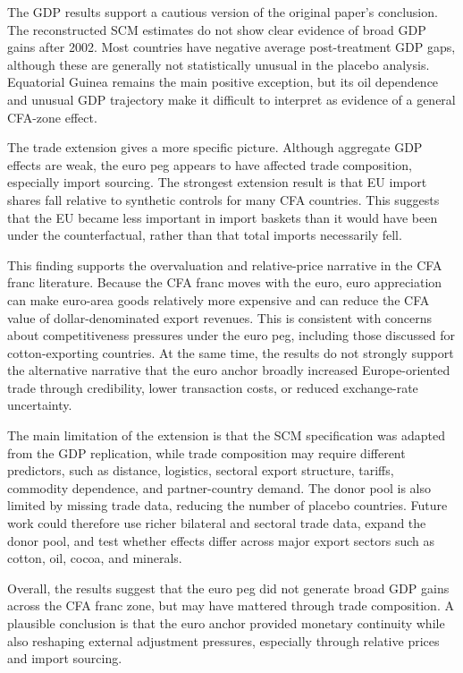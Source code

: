 \documentclass[a4paper]{article}
\begin{document}
The GDP results support a cautious version of the original paper's conclusion. The reconstructed SCM estimates do not show clear evidence of broad GDP gains after 2002. Most countries have negative average post-treatment GDP gaps, although these are generally not statistically unusual in the placebo analysis. Equatorial Guinea remains the main positive exception, but its oil dependence and unusual GDP trajectory make it difficult to interpret as evidence of a general CFA-zone effect.

The trade extension gives a more specific picture. Although aggregate GDP effects are weak, the euro peg appears to have affected trade composition, especially import sourcing. The strongest extension result is that EU import shares fall relative to synthetic controls for many CFA countries. This suggests that the EU became less important in import baskets than it would have been under the counterfactual, rather than that total imports necessarily fell.

This finding supports the overvaluation and relative-price narrative in the CFA franc literature. Because the CFA franc moves with the euro, euro appreciation can make euro-area goods relatively more expensive and can reduce the CFA value of dollar-denominated export revenues. This is consistent with concerns about competitiveness pressures under the euro peg, including those discussed for cotton-exporting countries. At the same time, the results do not strongly support the alternative narrative that the euro anchor broadly increased Europe-oriented trade through credibility, lower transaction costs, or reduced exchange-rate uncertainty.

The main limitation of the extension is that the SCM specification was adapted from the GDP replication, while trade composition may require different predictors, such as distance, logistics, sectoral export structure, tariffs, commodity dependence, and partner-country demand. The donor pool is also limited by missing trade data, reducing the number of placebo countries. Future work could therefore use richer bilateral and sectoral trade data, expand the donor pool, and test whether effects differ across major export sectors such as cotton, oil, cocoa, and minerals.

Overall, the results suggest that the euro peg did not generate broad GDP gains across the CFA franc zone, but may have mattered through trade composition. A plausible conclusion is that the euro anchor provided monetary continuity while also reshaping external adjustment pressures, especially through relative prices and import sourcing.
\end{document}
